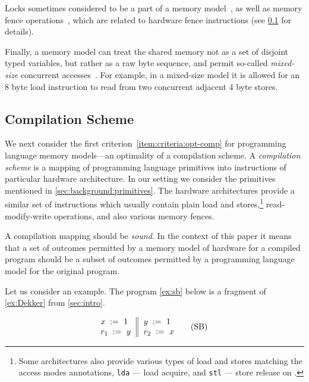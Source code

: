 Locks sometimes considered to be a part 
of a memory model~\cite{Manson-al:POPL05}, 
as well as memory fence operations~\cite{Batty-al:POPL11},
which are related to hardware fence instructions
(see \cref{sec:background:compile} for details). 

Finally, a memory model can treat the shared memory 
not as a set of disjoint typed variables, but rather as 
a raw byte sequence, and permit so-called \emph{mixed-size} 
concurrent accesses~\cite{Flur-al:POPL17}.
For example, in a mixed-size model it is 
allowed for an 8 byte load instruction 
to read from two concurrent adjacent 4 byte stores. 

\subsection{Compilation Scheme}
\label{sec:background:compile}

We next consider the first criterion~\ref{item:criteria:opt-comp}
for programming language memory models---an optimality of a compilation scheme. 
A \emph{compilation scheme} is a mapping of 
programming language primitives into 
instructions of particular hardware architecture. 
In our setting we consider the primitives 
mentioned in \cref{sec:background:primitives}.
The hardware architectures provide a similar set 
of instructions which usually contain 
plain load and stores,\footnote{Some architectures 
also provide various types of load and stores
matching the access modes annotations, 
\eg \texttt{lda} --- load acquire, 
and \texttt{stl} --- store release on .} 
read-modify-write operations, 
and also various memory fences. 

A compilation mapping should be \emph{sound}.
In the context of this paper it means that 
a set of outcomes permitted by a 
memory model of hardware for a compiled program 
should be a subset of outcomes permitted by a 
programming language model for the original program. 

Let us consider an example. 
The program \ref{ex:sb} below is a 
fragment of \ref{ex:Dekker} from \cref{sec:intro}.

\begin{equation*}
\inarrII{
   \writeInst{}{x}{1}   \\
   \readInst{}{r_1}{y}  \\
}{
  \writeInst{}{y}{1}   \\
  \readInst{}{r_2}{x}  \\
}
\tag{SB}\label{ex:sb}
\end{equation*}

